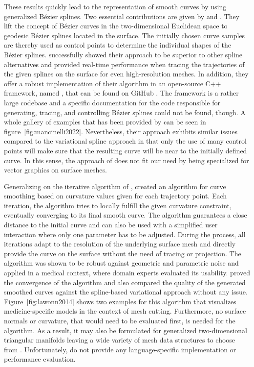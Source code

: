 \documentclass{stdlocal}
\begin{document}
These results quickly lead to the representation of smooth curves by using generalized Bézier splines.
Two essential contributions are given by \textcite{martinez2007} and \textcite{mancinelli2022}.
They lift the concept of Bézier curves in the two-dimensional Euclidean space to geodesic Bézier splines located in the surface.
The initially chosen curve samples are thereby used as control points to determine the individual shapes of the Bézier splines.
\textcite{mancinelli2022} successfully showed their approach to be superior to other spline alternatives and provided real-time performance when tracing the trajectories of the given splines on the surface for even high-resolution meshes.
In addition, they offer a robust implementation of their algorithm in an open-source C++ framework, named  \autocite{agus2019}, that can be found on GitHub .
The framework is a rather large codebase and a specific documentation for the code responsible for generating, tracing, and controlling Bézier splines could not be found, though.
A whole gallery of examples that has been provided by \textcite{mancinelli2022} can be seen in figure~\ref{fig:mancinelli2022}.
Nevertheless, their approach exhibits similar issues compared to the variational spline approach in that only the use of many control points will make sure that the resulting curve will be near to the initially defined curve.
In this sense, the approach of \textcite{mancinelli2022} does not fit our need by being specialized for vector graphics on surface meshes.

Generalizing on the iterative algorithm of \textcite{martinez2005}, \textcite{lawonn2014} created an algorithm for curve smoothing based on curvature values given for each trajectory point.
Each iteration, the algorithm tries to locally fulfill the given curvature constraint, eventually converging to its final smooth curve.
The algorithm guarantees a close distance to the initial curve and can also be used with a simplified user interaction where only one parameter has to be adjusted.
During the process, all iterations adapt to the resolution of the underlying surface mesh and directly provide the curve on the surface without the need of tracing or projection.
The algorithm was shown to be robust against geometric and parametric noise and applied in a medical context, where domain experts evaluated its usability.
\textcite{lawonn2014} proved the convergence of the algorithm and also compared the quality of the generated smoothed curves against the spline-based variational approach without any issue.
Figure~\ref{fig:lawonn2014} shows two examples for this algorithm that visualizes medicine-specific models in the context of mesh cutting.
Furthermore, no surface normals or curvature, that would need to be evaluated first, is needed for the algorithm.
As a result, it may also be formulated for generalized two-dimensional triangular manifolds leaving a wide variety of mesh data structures to choose from \autocite{guibas1985}.
Unfortunately, \textcite{lawonn2014} do not provide any language-specific implementation or performance evaluation.
\end{document}

